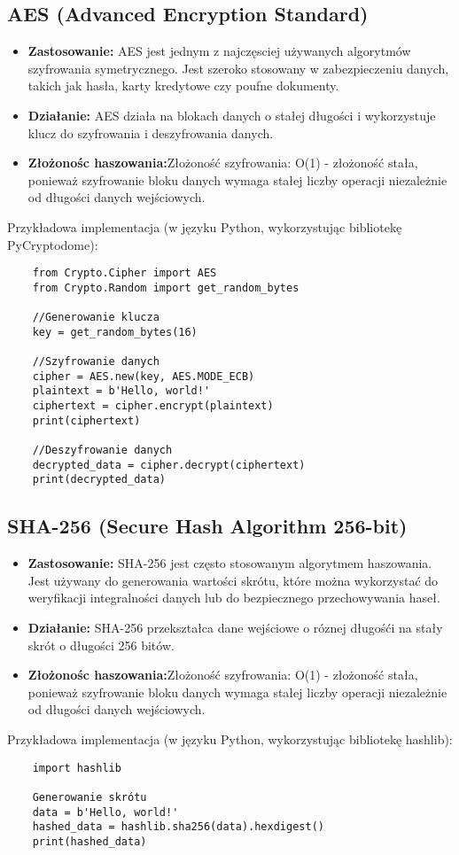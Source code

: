 \documentclass[options]{article}
\begin{document}
\subsection*{AES (Advanced Encryption Standard)}
\begin{itemize}
    \item \textbf{Zastosowanie:} AES jest jednym z najczęsciej używanych algorytmów szyfrowania symetrycznego. Jest szeroko stosowany w zabezpieczeniu danych, takich jak hasła, karty kredytowe czy poufne dokumenty.
    \item \textbf{Działanie:} AES działa na blokach danych o stałej długości i wykorzystuje klucz do szyfrowania i deszyfrowania danych.
    \item \textbf{Złożonośc haszowania:}Złożoność szyfrowania: O(1) - złożoność stała, ponieważ szyfrowanie bloku danych wymaga stałej liczby operacji niezależnie od długości danych wejściowych.
\end{itemize}
    Przykładowa implementacja (w języku Python, wykorzystując bibliotekę PyCryptodome): 
\begin{verbatim}
    from Crypto.Cipher import AES
    from Crypto.Random import get_random_bytes

    //Generowanie klucza
    key = get_random_bytes(16)

    //Szyfrowanie danych
    cipher = AES.new(key, AES.MODE_ECB)
    plaintext = b'Hello, world!'
    ciphertext = cipher.encrypt(plaintext)
    print(ciphertext)

    //Deszyfrowanie danych
    decrypted_data = cipher.decrypt(ciphertext)
    print(decrypted_data)
\end{verbatim}

\subsection*{SHA-256 (Secure Hash Algorithm 256-bit)}
\begin{itemize}
    \item \textbf{Zastosowanie:} SHA-256 jest często stosowanym algorytmem haszowania. Jest używany do generowania wartości skrótu, które można wykorzystać do weryfikacji integralności danych lub do bezpiecznego przechowywania haseł.
    \item \textbf{Działanie:} SHA-256 przekształca dane wejściowe o róznej długośći na stały skrót o długości 256 bitów.
    \item \textbf{Złożonośc haszowania:}Złożoność szyfrowania: O(1) - złożoność stała, ponieważ szyfrowanie bloku danych wymaga stałej liczby operacji niezależnie od długości danych wejściowych.
\end{itemize}
Przykładowa implementacja (w języku Python, wykorzystując bibliotekę hashlib):
\begin{verbatim}
    import hashlib

    Generowanie skrótu
    data = b'Hello, world!'
    hashed_data = hashlib.sha256(data).hexdigest()
    print(hashed_data)
\end{verbatim}
\end{document}
